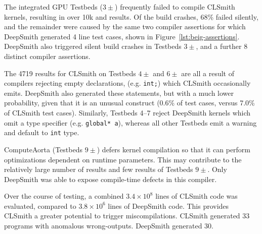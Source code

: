 The integrated GPU Testbeds ($3\pm$) frequently failed to compile CLSmith kernels, resulting in over 10k \bc and \bto results.
Of the build crashes, 68\% failed silently, and the remainder were caused by the same two compiler assertions for which DeepSmith generated 4 line test cases, shown in Figure~\ref{lst:beig-assertions}. DeepSmith also triggered silent build crashes in Testbeds $3\pm$, and a further 8 distinct compiler assertions.

The 4719 \abf results for CLSmith on Testbeds $4\pm$ and $6\pm$ are all a result of compilers rejecting empty declarations, (e.g. \texttt{int;}) which CLSmith occasionally emits. DeepSmith also generated these statements, but with a much lower probability, given that it is an unusual construct (0.6\% of test cases, versus 7.0\% of CLSmith test cases).
Similarly, Testbeds 4--7 reject DeepSmith kernels which omit a type specifier (e.g. \texttt{global* a}), whereas all other Testbeds emit a warning and default to \texttt{int} type.



ComputeAorta (Testbeds $9\pm$) defers kernel compilation so that it can perform optimizations dependent on runtime parameters. This may contribute to the relatively large number of \arc results and few \bc results of Testbeds $9\pm$. Only DeepSmith was able to expose compile-time defects in this compiler.


Over the course of testing, a combined $3.4 \times 10^8$ lines of CLSmith code was evaluated, compared to $3.8 \times 10^6$ lines of DeepSmith code. This provides CLSmith a greater potential to trigger miscompilations. CLSmith generated 33 programs with anomalous wrong-outputs. DeepSmith generated 30.


